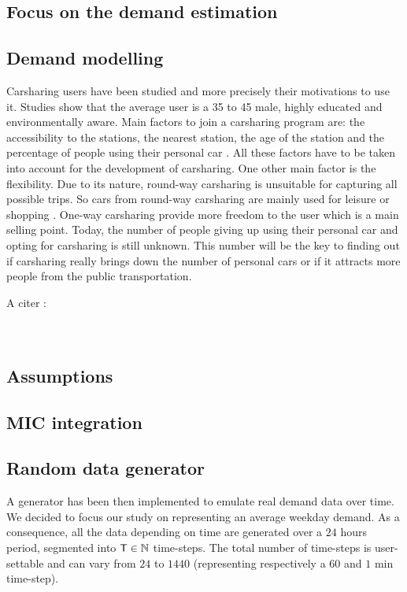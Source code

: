 \begin{bibunit}[ieeetr]
\newpage
\section{Focus on the demand estimation}

\subsection{Demand modelling}
Carsharing users have been studied and more precisely their motivations to use it.
Studies show that the average user is a 35 to 45 male, highly educated and environmentally aware.
Main factors to join a carsharing program are: the accessibility to the stations, the nearest station, the age of the station and the percentage of people using their personal car \cite{jorge_carsharing_2013}.
All these factors have to be taken into account for the development of carsharing.
One other main factor is the flexibility.
Due to its nature, round-way carsharing is unsuitable for capturing all possible trips.
So cars from round-way carsharing are mainly used for leisure or shopping \cite{barth_shared_use_2002, costain_synopsis_2012}.
One-way carsharing provide more freedom to the user which is a main selling point.
Today, the number of people giving up using their personal car and opting for carsharing is still unknown.
This number will be the key to finding out if carsharing really brings down the number of personal cars or if it attracts more people from the public transportation.

A citer :\\
\cite{modele_deplacement_dreif_2008}\\
\cite{danielis_potential_2015}\\


\subsection{Assumptions}




\subsection{MIC integration}




\subsection{Random data generator}
A generator has been then implemented to emulate real demand data over time. We decided to focus our study on representing an average weekday demand. As a consequence, all the data depending on time are generated over a $24$ hours period, segmented into $\mathsf{T} \in \mathbb{N}$ time-steps. The total number of time-steps is user-settable and can vary from $24$ to $1440$ (representing respectively a $60$ and $1$ min time-step).


\end{bibunit}

